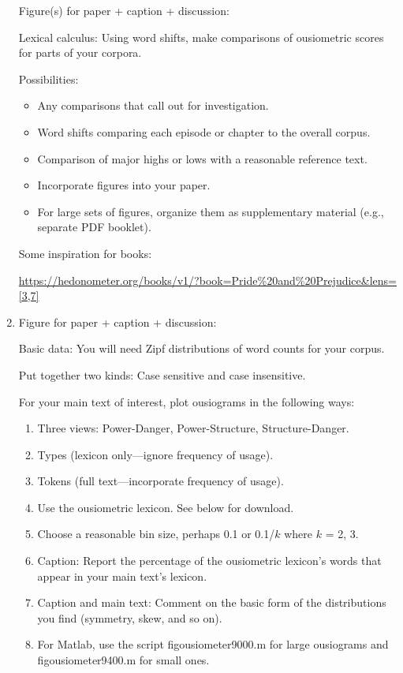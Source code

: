 \begin{enumerate}
  Figure(s) for paper + caption + discussion:

  

  Lexical calculus: Using word shifts, make comparisons of ousiometric scores for
  parts of your corpora.

  Possibilities:
  \begin{itemize}
  \item
    Any comparisons that call out for investigation.
  \item
    Word shifts comparing each episode or chapter to the overall corpus.
  \item
    Comparison of major highs or lows with a reasonable reference text.
  \end{itemize}

  \begin{itemize}
  \item 
    Incorporate figures into your paper.
  \item
    For large sets of figures, organize them as supplementary material (e.g., separate PDF booklet).
  \end{itemize}

  Some inspiration for books:

  \url{https://hedonometer.org/books/v1/?book=Pride%20and%20Prejudice&lens=[3,7]}
  
  
\item
  Figure for paper + caption + discussion:

  Basic data: You will need Zipf distributions of word counts for your corpus.

  Put together two kinds: Case sensitive and case insensitive.
  
  For your main text of interest, plot
  ousiograms 
  in the following ways:
  \begin{enumerate}
  \item
    Three views: Power-Danger, Power-Structure, Structure-Danger.
  \item
    Types (lexicon only---ignore frequency of usage).
  \item
    Tokens (full text---incorporate frequency of usage).
  \item
    Use the ousiometric lexicon. See below for download.
  \item
    Choose a reasonable bin size, perhaps 0.1 or 0.1/$k$ where $k$ = 2, 3.
  \item
    Caption: Report the percentage of the ousiometric lexicon's words
    that appear in your main text's lexicon.
  \item
    Caption and main text:
    Comment on the basic form of the distributions you find
    (symmetry, skew, and so on).
  \item
    For Matlab, use the script figousiometer9000.m for large ousiograms
    and figousiometer9400.m for small ones.
  \end{enumerate}




\end{enumerate}
